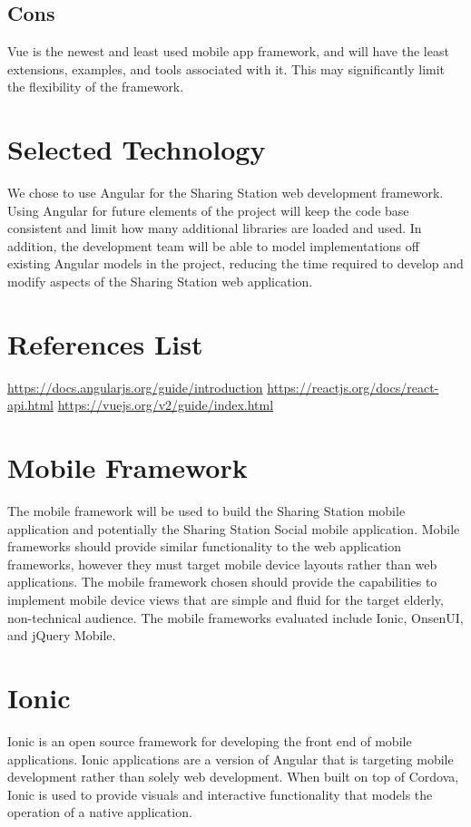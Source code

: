 \documentclass[letterpaper,10pt,draftclsnofoot,onecolumn]{IEEEtran}
\begin{document}
\subsection*{Cons}
Vue is the newest and least used mobile app framework, and will have the least extensions, examples, and tools associated with it. This may significantly limit the flexibility of the framework.
\section*{Selected Technology}
We chose to use Angular for the Sharing Station web development framework. Using Angular for future elements of the project will keep the code base consistent and limit how many additional libraries are loaded and used. In addition, the development team will be able to model implementations off existing Angular models in the project, reducing the time required to develop and modify aspects of the Sharing Station web application.
\section*{References List}
\url{https://docs.angularjs.org/guide/introduction}\newline
\url{https://reactjs.org/docs/react-api.html}\newline
\url{https://vuejs.org/v2/guide/index.html}\newline
\pagebreak

\section*{Mobile Framework}
The mobile framework will be used to build the Sharing Station mobile application and potentially the Sharing Station Social mobile application. Mobile frameworks should provide similar functionality to the web application frameworks, however they must target mobile device layouts rather than web applications. 
The mobile framework chosen should provide the capabilities to implement mobile device views that are simple and fluid for the target elderly, non-technical audience. The mobile frameworks evaluated include Ionic, OnsenUI, and jQuery Mobile.
\section*{Ionic}
Ionic is an open source framework for developing the front end of mobile applications. Ionic applications are a version of Angular that is targeting mobile development rather than solely web development. When built on top of Cordova, Ionic is used to provide visuals and interactive functionality that models the operation of a native application.
\end{document}
